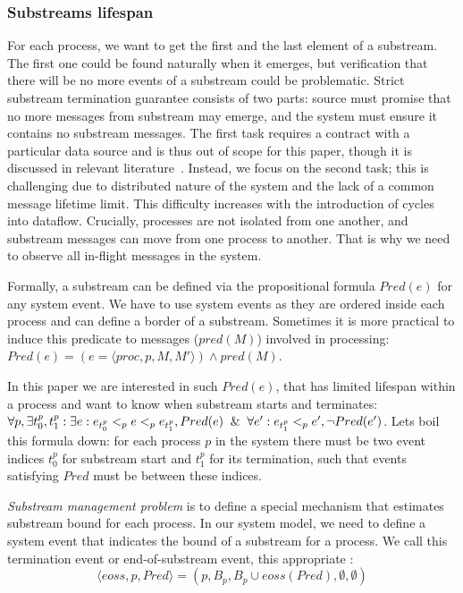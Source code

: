 \subsubsection{Substreams lifespan}

For each process, we want to get the first and the last element of a substream. The first one could be found naturally when it emerges, but verification that there will be no more events of a substream could be problematic. Strict substream termination guarantee consists of two parts: source must promise that no more messages from substream may emerge, and the system must ensure it contains no substream messages. The first task requires a contract with a particular data source and is thus out of scope for this paper, though it is discussed in relevant literature~\cite{awad2019adaptive}. Instead, we focus on the second task; this is challenging due to distributed nature of the system and the lack of a common message lifetime limit. This difficulty increases with the introduction of cycles into dataflow. Crucially, processes are not isolated from one another, and substream messages can move from one process to another. That is why we need to observe all in-flight messages in the system.

Formally, a substream can be defined via the propositional formula $Pred(e)$ for any system event. We have to use system events as they are ordered inside each process and can define a border of a substream. Sometimes it is more practical to induce this predicate to messages ($pred(M)$) involved in processing: $Pred(e) = (e = \langle proc, p, M, M'\rangle) \wedge pred(M)$.

In this paper we are interested in such $Pred(e)$, that has limited lifespan within a process and want to know when substream starts and terminates: $\forall p, \exists t_0^p, t_1^p: \exists e: e_{t_0^p} <_p e <_p e_{t_1^p}, Pred(e) \And \forall e': e_{t_1^p} <_p e', \neg Pred(e')$. Lets boil this formula down: for each process $p$ in the system there must be two event indices $t_0^p$ for substream start and $t_1^p$ for its termination, such that events satisfying $Pred$ must be between these indices. 

{\em Substream management problem} is to define a special mechanism that estimates substream bound for each process. In our system model, we need to define a system event that indicates the bound of a substream for a process. We call this termination event or end-of-substream event, this appropriate :
\begin{equation}
  \langle eoss, p, Pred \rangle = (p, B_p, B_p\cup eoss(Pred), \emptyset, \emptyset)  
\end{equation}

